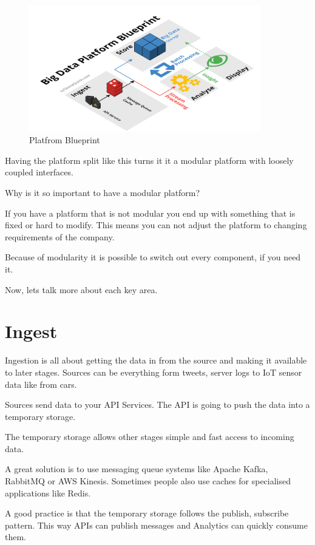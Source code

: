 \documentclass[12pt, numbers=noenddot]{scrreprt} %
\begin{document}
\begin{figure}[htbp]
  \centering
     \includegraphics[width=0.9\textwidth]{images/Big-Data-Platform-Blueprint-Title-Original.png}
  \caption{Platfrom Blueprint}
  \label{fig:Bild1}
\end{figure}


Having the platform split like this turns it it a modular platform with loosely coupled interfaces.

Why is it so important to have a modular platform?

If you have a platform that is not modular you end up with something that is fixed or hard to modify. This means you can not adjust the platform to changing requirements of the company.

Because of modularity it is possible to switch out every component, if you need it.

Now, lets talk more about each key area.

\section{Ingest}
Ingestion is all about getting the data in from the source and making it available to later stages. Sources can be everything form tweets, server logs to IoT sensor data like from cars.

Sources send data to your API Services. The API is going to push the data into a temporary storage.

The temporary storage allows other stages simple and fast access to incoming data.

A great solution is to use messaging queue systems like Apache Kafka, RabbitMQ or AWS Kinesis. Sometimes people also use caches for specialised applications like Redis.

A good practice is that the temporary storage follows the publish, subscribe pattern. This way APIs can publish messages and Analytics can quickly consume them.
\end{document}
